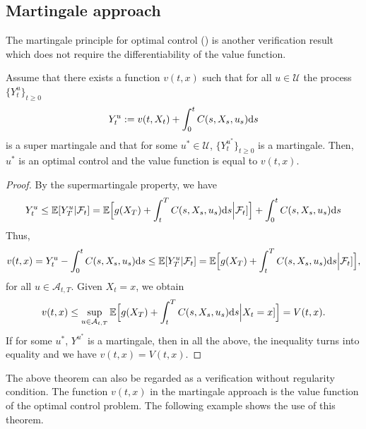 \documentclass[11pt]{book}
\newcommand{\ds}{\text{\normalfont d}s}
\begin{document}
\subsection{Martingale approach}\label{sec:martingale}
The martingale principle for optimal control (\cite{DV73}) is another verification result which does not require the differentiability of the value function.
\begin{thm}\label{thm:martingale_verification}
	Assume that there exists a function $v(t,x)$ such that for all $u\in\mathcal{U}$ the process $\{Y^u_t\}_{t\ge0}$
	\begin{equation}
		Y^u_t:=v(t,X_t)+\int_0^tC(s,X_s,u_s){{\ds}}
	\end{equation}
	is a super martingale and that for some $u^*\in\mathcal{U}$, $\{Y^{u^*}_t\}_{t\ge0}$ is a martingale. Then, $u^*$ is an optimal control and the value function is equal to $v(t,x)$.
\end{thm}
\begin{proof}
By the supermartingale property, we have
\begin{equation}
Y^u_t\le\mathbb{E}[Y^u_T|\mathcal{F}_t]=\mathbb{E}\Big[g(X_T)+\int_t^TC(s,X_s,u_s){{\ds}}\Big|\mathcal{F}_t]\Big]+\int_0^tC(s,X_s,u_s){{\ds}}
\end{equation}
Thus, 
\begin{equation}
v(t,x)=Y^u_t-\int_0^tC(s,X_s,u_s){{\ds}}\le\mathbb{E}[Y^u_T|\mathcal{F}_t]=\mathbb{E}\Big[g(X_T)+\int_t^TC(s,X_s,u_s){{\ds}}\Big|\mathcal{F}_t]\Big],
\end{equation}
for all $u\in\mathcal{A}_{t,T}$. Given $X_t=x$, we obtain
\begin{equation}
v(t,x)\le\sup_{u\in\mathcal{A}_{t,T}}\mathbb{E}\Big[g(X_T)+\int_t^TC(s,X_s,u_s){{\ds}}\Big|X_t=x]\Big]=V(t,x).
\end{equation}
If for some $u^*$, $Y^{u^*}$ is a martingale, then in all the above, the inequality turns into equality and we have $v(t,x)=V(t,x)$.
\end{proof}
The above theorem can also be regarded as a verification without regularity condition. The function $v(t,x)$ in the martingale approach is the value function of the optimal control problem. The following example shows the use of this theorem.
\end{document}
